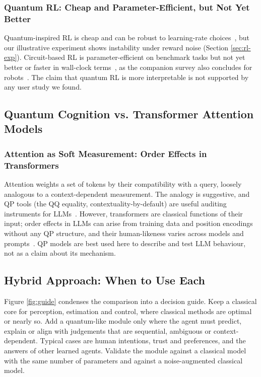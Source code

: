 \documentclass[pdflatex,sn-basic]{sn-jnl}
\begin{document}
\subsubsection{Quantum RL: Cheap and Parameter-Efficient, but Not Yet Better}
Quantum-inspired RL is cheap and can be robust to learning-rate choices~\citep{Dong2012}, but our illustrative experiment shows instability under reward noise (Section \ref{sec:rl-exp}). Circuit-based RL is parameter-efficient on benchmark tasks but not yet better or faster in wall-clock terms~\citep{Skolik2022,Jerbi2021,Meyer2022}, as the companion survey also concludes for robots~\citep{Guru2026}. The claim that quantum RL is more interpretable is not supported by any user study we found.

\subsection{Quantum Cognition vs. Transformer Attention Models}\label{sec:vs-attention}

\subsubsection{Attention as Soft Measurement: Order Effects in Transformers}
Attention weights a set of tokens by their compatibility with a query, loosely analogous to a context-dependent measurement. The analogy is suggestive, and QP tools (the QQ equality, contextuality-by-default) are useful auditing instruments for LLMs~\citep{Lo2025,Kang2026}. However, transformers are classical functions of their input; order effects in LLMs can arise from training data and position encodings without any QP structure, and their human-likeness varies across models and prompts~\citep{Tjuatja2024,Imannezhad2026}. QP models are best used here to describe and test LLM behaviour, not as a claim about its mechanism.

\subsection{Hybrid Approach: When to Use Each}\label{sec:guide}
Figure \ref{fig:guide} condenses the comparison into a decision guide. Keep a classical core for perception, estimation and control, where classical methods are optimal or nearly so. Add a quantum-like module only where the agent must predict, explain or align with judgements that are sequential, ambiguous or context-dependent. Typical cases are human intentions, trust and preferences, and the answers of other learned agents. Validate the module against a classical model with the same number of parameters and against a noise-augmented classical model.
\end{document}

